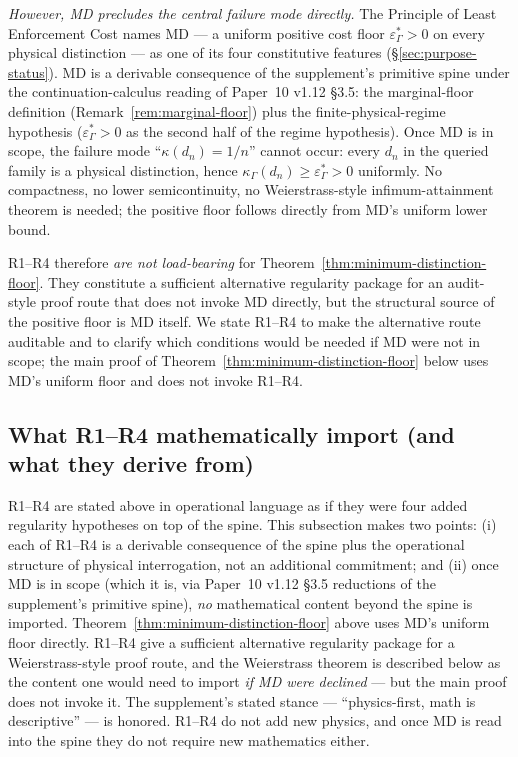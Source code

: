 \documentclass[11pt]{article}
\begin{document}
\emph{However, MD precludes the central failure mode directly.}  The Principle of Least Enforcement Cost names MD --- a uniform positive cost floor $\varepsilon^*_\Gamma > 0$ on every physical distinction --- as one of its four constitutive features (\S\ref{sec:purpose-status}).  MD is a derivable consequence of the supplement's primitive spine under the continuation-calculus reading of Paper~10 v1.12 \S3.5: the marginal-floor definition (Remark~\ref{rem:marginal-floor}) plus the finite-physical-regime hypothesis ($\varepsilon^*_\Gamma > 0$ as the second half of the regime hypothesis).  Once MD is in scope, the failure mode ``$\kappa(d_n) = 1/n$'' cannot occur: every $d_n$ in the queried family is a physical distinction, hence $\kappa_\Gamma(d_n) \ge \varepsilon^*_\Gamma > 0$ uniformly.  No compactness, no lower semicontinuity, no Weierstrass-style infimum-attainment theorem is needed; the positive floor follows directly from MD's uniform lower bound.

R1--R4 therefore \emph{are not load-bearing} for Theorem~\ref{thm:minimum-distinction-floor}.  They constitute a sufficient alternative regularity package for an audit-style proof route that does not invoke MD directly, but the structural source of the positive floor is MD itself.  We state R1--R4 to make the alternative route auditable and to clarify which conditions would be needed if MD were not in scope; the main proof of Theorem~\ref{thm:minimum-distinction-floor} below uses MD's uniform floor and does not invoke R1--R4.

\subsection{What R1--R4 mathematically import (and what they derive from)}\label{subsec:R1-R4-mathematical-import}

R1--R4 are stated above in operational language as if they were four added regularity hypotheses on top of the spine.  This subsection makes two points: (i) each of R1--R4 is a derivable consequence of the spine plus the operational structure of physical interrogation, not an additional commitment; and (ii) once MD is in scope (which it is, via Paper~10 v1.12 \S3.5 reductions of the supplement's primitive spine), \emph{no} mathematical content beyond the spine is imported.  Theorem~\ref{thm:minimum-distinction-floor} above uses MD's uniform floor directly.  R1--R4 give a sufficient alternative regularity package for a Weierstrass-style proof route, and the Weierstrass theorem is described below as the content one would need to import \emph{if MD were declined} --- but the main proof does not invoke it.  The supplement's stated stance --- ``physics-first, math is descriptive'' --- is honored.  R1--R4 do not add new physics, and once MD is read into the spine they do not require new mathematics either.
\end{document}
